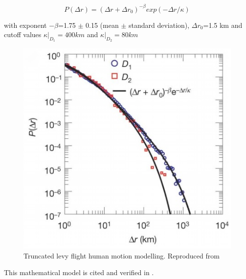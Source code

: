 \documentclass[12pt, a4paper]{report}
\theoremstyle{definition}
\theoremstyle{definition}%
\theoremstyle{definition}%
\theoremstyle{definition}%
\theoremstyle{definition}%
\theoremstyle{definition}%
\begin{document}
\begin{equation}\label{displacement_distribution}
P(\Delta r) = (\Delta r + \Delta r_{0})^{-\beta}  exp(-\Delta r/\kappa)
\end{equation} 

with exponent $-\beta$=1.75 $\pm$ 0.15 (mean $\pm$ standard deviation), $\Delta r_{0}$=1.5 km and cutoff values $\kappa|_{D_{1}}=400 km$ and $\kappa|_{D_{2}}=80 km$ 

\begin{figure}[h]	
	\includegraphics[scale=0.75]{truncated_power_law}
	\centering
	\caption{Truncated levy flight human motion modelling. Reproduced from \cite{Gonzalez2008}}
	\label{fig:levy_flight}
\end{figure}

This mathematical model is cited and verified in \cite{Calabrese2013}.
\end{document}
